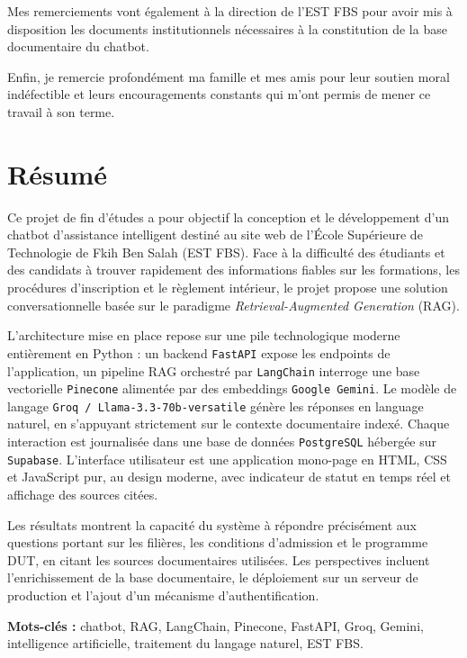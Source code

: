 \documentclass[12pt, a4paper, twoside]{report}
\newcommand{\tech}[1]{\texttt{\color{accent}#1}}
\newcommand{\term}[1]{\textit{\color{primary}#1}}
\begin{document}
Mes remerciements vont également à la direction de l'EST FBS pour avoir mis à disposition les documents institutionnels nécessaires à la constitution de la base documentaire du chatbot.

Enfin, je remercie profondément ma famille et mes amis pour leur soutien moral indéfectible et leurs encouragements constants qui m'ont permis de mener ce travail à son terme.

\cleardoublepage

\chapter*{Résumé}

Ce projet de fin d'études a pour objectif la conception et le développement d'un chatbot d'assistance intelligent destiné au site web de l'École Supérieure de Technologie de Fkih Ben Salah (EST FBS). Face à la difficulté des étudiants et des candidats à trouver rapidement des informations fiables sur les formations, les procédures d'inscription et le règlement intérieur, le projet propose une solution conversationnelle basée sur le paradigme \term{Retrieval-Augmented Generation} (RAG).

L'architecture mise en place repose sur une pile technologique moderne entièrement en Python : un backend \tech{FastAPI} expose les endpoints de l'application, un pipeline RAG orchestré par \tech{LangChain} interroge une base vectorielle \tech{Pinecone} alimentée par des embeddings \tech{Google Gemini}. Le modèle de langage \tech{Groq / Llama-3.3-70b-versatile} génère les réponses en language naturel, en s'appuyant strictement sur le contexte documentaire indexé. Chaque interaction est journalisée dans une base de données \tech{PostgreSQL} hébergée sur \tech{Supabase}. L'interface utilisateur est une application mono-page en HTML, CSS et JavaScript pur, au design moderne, avec indicateur de statut en temps réel et affichage des sources citées.

Les résultats montrent la capacité du système à répondre précisément aux questions portant sur les filières, les conditions d'admission et le programme DUT, en citant les sources documentaires utilisées. Les perspectives incluent l'enrichissement de la base documentaire, le déploiement sur un serveur de production et l'ajout d'un mécanisme d'authentification.

\vspace{0.8cm}
\noindent\textbf{Mots-clés :} chatbot, RAG, LangChain, Pinecone, FastAPI, Groq, Gemini, intelligence artificielle, traitement du langage naturel, EST FBS.
\end{document}

